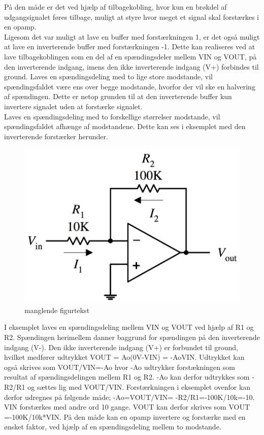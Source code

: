 På den måde er det ved hjælp af tilbagekobling, hvor kun en brøkdel af udgangsignalet føres tilbage, muligt at styre hvor meget et signal skal forstærkes i en opamp.\\
%
Ligesom det var muligt at lave en buffer med forstærkningen 1, er det også muligt at lave en inverterende buffer med forstærkningen -1. Dette kan realiseres ved at lave tilbagekoblingen som en del af en spændingsdeler mellem VIN og VOUT, på den inverterende indgang, imens den ikke inverterende indgang (V+) forbindes til ground. Laves en spændingsdeling med to lige store modstande, vil spændingsfaldet være ens over begge modstande, hvorfor der vil ske en halvering af spændingen. Dette er netop grunden til at den inverterende buffer kun invertere signalet uden at forstærke signalet.\\
%
Laves en spændingsdeling med to forskellige størrelser modstande, vil spændingsfaldet afhænge af modstandene. Dette kan ses i eksemplet med den inverterende forstærker herunder.
%
\begin{figure}[H]
\centering
\includegraphics[resolution=300,width=\textwidth/2]{Figure/Introduktion/TilbagekoblingSpaendingsdeling10K100KOpAmp.png}
\caption{manglende figurtekst}
\label{fig:TilbagekoblingSpaendingsdeling10K100KOpAmp}
\end{figure}
\noindent
%
I eksemplet laves en spændingsdeling mellem VIN og VOUT ved hjælp af R1 og R2. Spændingen herimellem danner baggrund for spændingen på den inverterende indgang (V-). Den ikke inverterende indgang (V+) er forbundet til ground, hvilket medfører udtrykket VOUT = Ao(0V-VIN) = -AoVIN. Udtrykket kan også skrives som VOUT/VIN=-Ao hvor -Ao udtrykker forstækningen som resultat af spændingsdelingen mellem R1 og R2. -Ao kan derfor udtrykkes som -R2/R1 og sættes lig med VOUT/VIN. Forstærkningen i eksemplet ovenfor kan derfor udregnes på følgende måde; -Ao=VOUT/VIN= -R2/R1=-100K/10k=-10. VIN forstærkes med andre ord 10 gange. VOUT kan derfor skrives som VOUT =-100K/10k*VIN. På den måde kan en opamp invertere og forstærke med en ønsket faktor, ved hjælp af en spændingsdeling mellem to modstande.\\

